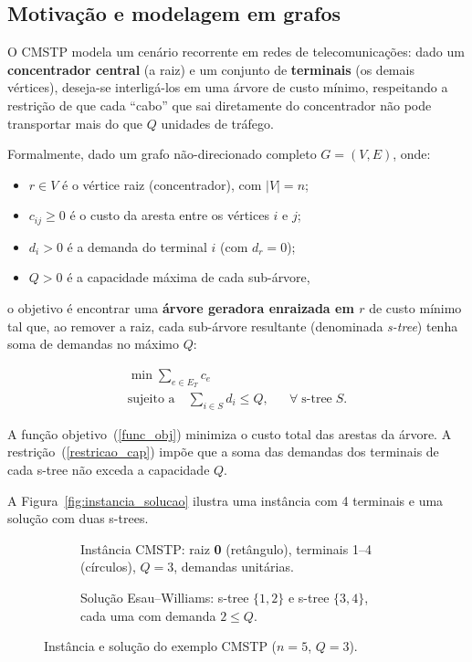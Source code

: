 \documentclass[12pt]{article}
\begin{document}
\subsection{Motivação e modelagem em grafos}

O CMSTP modela um cenário recorrente em redes de telecomunicações: dado um \textbf{concentrador central} (a raiz) e um conjunto de \textbf{terminais} (os demais vértices), deseja-se interligá-los em uma árvore de custo mínimo, respeitando a restrição de que cada ``cabo'' que sai diretamente do concentrador não pode transportar mais do que $Q$ unidades de tráfego.

Formalmente, dado um grafo não-direcionado completo $G = (V, E)$, onde:
\begin{itemize}[noitemsep]
    \item $r \in V$ é o vértice raiz (concentrador), com $|V| = n$;
    \item $c_{ij} \geq 0$ é o custo da aresta entre os vértices $i$ e $j$;
    \item $d_i > 0$ é a demanda do terminal $i$ (com $d_r = 0$);
    \item $Q > 0$ é a capacidade máxima de cada sub-árvore,
\end{itemize}
o objetivo é encontrar uma \textbf{árvore geradora enraizada em $r$} de custo mínimo tal que, ao remover a raiz, cada sub-árvore resultante (denominada \textit{s-tree}) tenha soma de demandas no máximo $Q$:

\begin{eqnarray}
    \min \sum_{e \in E_T} c_e && \label{func_obj} \\
    \text{sujeito a} \quad \sum_{i \in S} d_i \leq Q, && \forall\; \text{s-tree}\; S. \label{restricao_cap}
\end{eqnarray}

A função objetivo~(\ref{func_obj}) minimiza o custo total das arestas da árvore. A restrição~(\ref{restricao_cap}) impõe que a soma das demandas dos terminais de cada s-tree não exceda a capacidade $Q$.

A Figura~\ref{fig:instancia_solucao} ilustra uma instância com 4 terminais e uma solução com duas s-trees.

\begin{figure}[ht!]
  \label{fig:instancia_solucao}
  \centering

  \begin{subfigure}{0.45\textwidth}
    \centering
    \resizebox{0.95\textwidth}{!}{
    
    }
    \caption{Instância CMSTP: raiz \textbf{0} (retângulo), terminais 1--4 (círculos), $Q = 3$, demandas unitárias.}
    \label{fig:instancia}
  \end{subfigure}
  \hfill
  \begin{subfigure}{0.45\textwidth}
    \centering
    \resizebox{0.95\textwidth}{!}{
    
    }
    \caption{Solução Esau--Williams: s-tree $\{1,2\}$ e s-tree $\{3,4\}$, cada uma com demanda $2 \leq Q$.}
    \label{fig:solucao}
  \end{subfigure}

  \caption{Instância e solução do exemplo CMSTP ($n=5$, $Q=3$).}
\end{figure}
\end{document}
